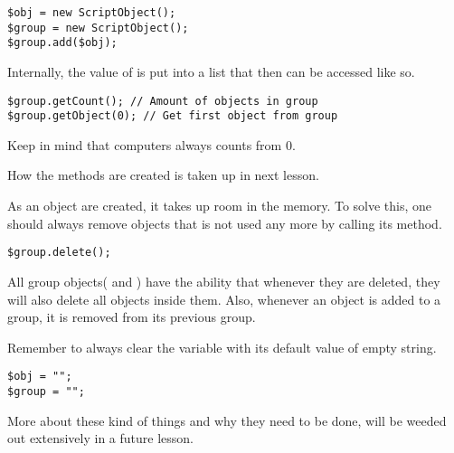 \begin{lstlisting}[style=ts]
$obj = new ScriptObject();
$group = new ScriptObject();
$group.add($obj);
\end{lstlisting}

Internally, the value of  is put into a list that then can be accessed like so.

\begin{lstlisting}[style=ts]
$group.getCount(); // Amount of objects in group
$group.getObject(0); // Get first object from group
\end{lstlisting}

Keep in mind that computers always counts from 0.

How the methods are created is taken up in next lesson.

As an object are created, it takes up room in the memory. To solve this, one should always remove objects that is not used any more by calling its  method.

\begin{lstlisting}[style=ts]
$group.delete();
\end{lstlisting}

All group objects( and ) have the ability that whenever they are deleted, they will also delete all objects inside them. Also, whenever an object is added to a group, it is removed from its previous group.

Remember to always clear the variable with its default value of empty string.

\begin{lstlisting}[style=ts]
$obj = "";
$group = "";
\end{lstlisting}

More about these kind of things and why they need to be done, will be weeded out extensively in a future lesson.

